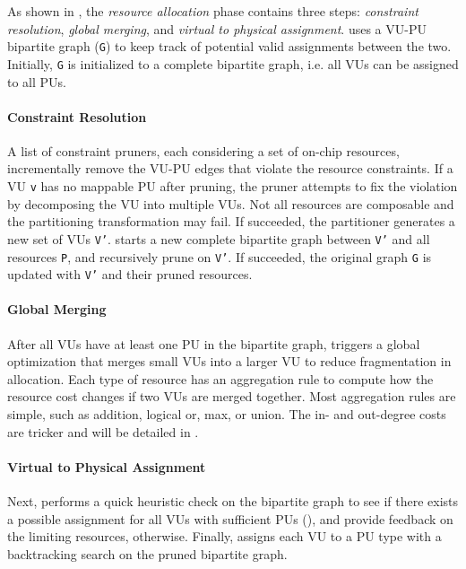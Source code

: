 As shown in , the \emph{resource allocation} phase contains three steps:
\emph{constraint resolution}, \emph{global merging}, and \emph{virtual to physical assignment}.
\name uses a VU-PU bipartite graph (\texttt{G}) to keep track of potential valid assignments between the two.
Initially, \texttt{G} is initialized to a complete bipartite graph, i.e. all VUs can be assigned to
all PUs.

\paragraph{Constraint Resolution}
A list of constraint pruners, each considering a set of on-chip resources, 
incrementally remove the VU-PU edges that violate the resource constraints.
If a VU \texttt{v} has no mappable PU after pruning, the pruner attempts to fix the violation by
decomposing the VU into multiple VUs. 
Not all resources are composable and the partitioning transformation may fail.
If succeeded, the partitioner generates a new set of VUs \texttt{V'}. \name starts a new complete bipartite
graph between \texttt{V'} and all resources \texttt{P}, and recursively prune on \texttt{V'}.
If succeeded, the original graph \texttt{G} is updated with \texttt{V'} and their pruned resources.

\paragraph{Global Merging}
After all VUs have at least one PU in the bipartite graph, \name triggers a global optimization that merges 
small VUs into a larger VU to reduce fragmentation in allocation.
Each type of resource has an aggregation rule to compute how the resource cost changes if two VUs are merged
together. Most aggregation rules are simple, such as addition, logical or, max, or union.
The in- and out-degree costs are tricker and will be detailed in .

\paragraph{Virtual to Physical Assignment}
Next, \name performs a quick heuristic check on the bipartite graph to see if there exists a
possible assignment for all VUs with sufficient PUs (), and provide feedback on the
limiting resources, otherwise.
Finally, \name assigns each VU to a PU type with a backtracking search on the pruned bipartite
graph.

